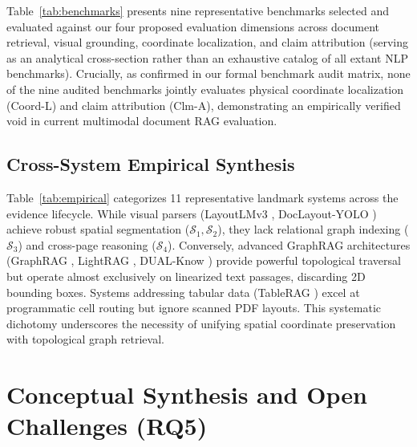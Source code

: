 \documentclass[conference,a4paper]{IEEEtran}
\begin{document}
Table~\ref{tab:benchmarks} presents nine representative benchmarks selected and evaluated against our four proposed evaluation dimensions across document retrieval, visual grounding, coordinate localization, and claim attribution (serving as an analytical cross-section rather than an exhaustive catalog of all extant NLP benchmarks). Crucially, as confirmed in our formal benchmark audit matrix, none of the nine audited benchmarks jointly evaluates physical coordinate localization (Coord-L) and claim attribution (Clm-A), demonstrating an empirically verified void in current multimodal document RAG evaluation.

\subsection{Cross-System Empirical Synthesis}
Table~\ref{tab:empirical} categorizes 11 representative landmark systems across the evidence lifecycle. While visual parsers (LayoutLMv3 \cite{huang2022}, DocLayout-YOLO \cite{zhao2024doclayout}) achieve robust spatial segmentation ($\mathcal{S}_1, \mathcal{S}_2$), they lack relational graph indexing ($\mathcal{S}_3$) and cross-page reasoning ($\mathcal{S}_4$). Conversely, advanced GraphRAG architectures (GraphRAG \cite{edge2024}, LightRAG \cite{guo2025lightrag}, DUAL-Know \cite{qi2026}) provide powerful topological traversal but operate almost exclusively on linearized text passages, discarding 2D bounding boxes. Systems addressing tabular data (TableRAG \cite{chen2024tablerag}) excel at programmatic cell routing but ignore scanned PDF layouts. This systematic dichotomy underscores the necessity of unifying spatial coordinate preservation with topological graph retrieval.

\section{Conceptual Synthesis and Open Challenges (RQ5)}
\end{document}
